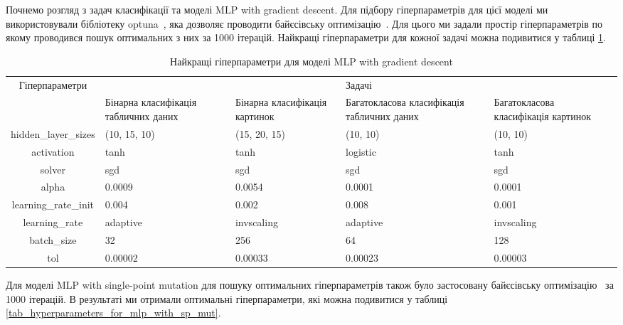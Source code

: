 Почнемо розгляд з задач класифікації та моделі MLP with gradient descent. Для підбору гіперпараметрів для цієї моделі ми використовували бібліотеку optuna~\cite{ct22}, яка дозволяє проводити байєсівську оптимізацію~\cite{ct37}. Для цього ми задали простір гіперпараметрів по якому проводився пошук оптимальних з них за 1000 ітерацій. Найкращі гіперпараметри для кожної задачі можна подивитися у таблиці \ref{tab_hyperparameters_for_mlp_with_gd}.

\begin{table}[ht]
	\caption{Найкращі гіперпараметри для моделі MLP with gradient descent}
	\label{tab_hyperparameters_for_mlp_with_gd}
	\centering
	\begin{adjustbox}{max width=\textwidth}
		\begin{tabular}{|c|p{3cm}|p{3cm}|p{3cm}|p{3cm}|}
			\hline \multirow{2}{*}{Гіперпараметри} & \multicolumn{4}{c|}{Задачі} \\
			\cline{2-5} & Бінарна класифікація табличних даних & Бінарна класифікація картинок & Багатокласова класифікація табличних даних & Багатокласова класифікація картинок \\
			\hline hidden\_layer\_sizes & (10, 15, 10) & (15, 20, 15) & (10, 10) & (10, 10) \\
			\hline activation & tanh & tanh & logistic & tanh \\
			\hline solver & sgd & sgd & sgd & sgd \\
			\hline alpha & 0.0009 & 0.0054 & 0.0001 & 0.0001 \\
			\hline learning\_rate\_init & 0.004 & 0.002 & 0.008 & 0.001 \\
			\hline learning\_rate & adaptive & invscaling & adaptive & invscaling \\
			\hline batch\_size & 32 & 256 & 64 & 128 \\
			\hline tol & 0.00002 & 0.00033 & 0.00023 & 0.00003 \\
			\hline
		\end{tabular}
	\end{adjustbox}
\end{table}

Для моделі MLP with single-point mutation для пошуку оптимальних гіперпараметрів також було застосовану байєсівську оптимізацію~\cite{ct37} за 1000 ітерацій. В результаті ми отримали оптимальні гіперпараметри, які можна подивитися у таблиці \ref{tab_hyperparameters_for_mlp_with_sp_mut}.

